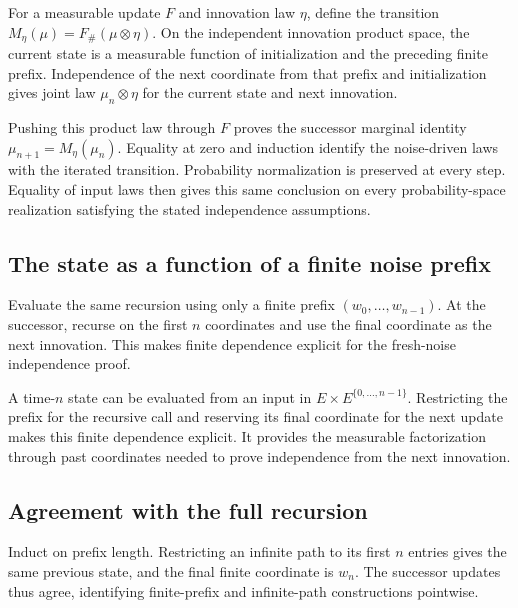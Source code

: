 \documentclass[11pt,a4paper]{report}
\begin{document}
For a measurable update \(F\) and innovation law \(\eta\), define the transition \(M_\eta(\mu)=F_\#(\mu\otimes\eta)\). On the independent innovation product space, the current state is a measurable function of initialization and the preceding finite prefix. Independence of the next coordinate from that prefix and initialization gives joint law \(\mu_n\otimes\eta\) for the current state and next innovation.



Pushing this product law through \(F\) proves the successor marginal identity \(\mu_{n+1}=M_\eta(\mu_n)\). Equality at zero and induction identify the noise-driven laws with the iterated transition. Probability normalization is preserved at every step. Equality of input laws then gives this same conclusion on every probability-space realization satisfying the stated independence assumptions.

\subsection{\texorpdfstring{The state as a function of a finite noise prefix}{The state as a function of a finite noise prefix}}
\label{report-step-UnadjustedLangevin-MarkovLaw-lean-1}


Evaluate the same recursion using only a finite prefix \((w_0,\ldots,w_{n-1})\). At the successor, recurse on the first \(n\) coordinates and use the final coordinate as the next innovation. This makes finite dependence explicit for the fresh-noise independence proof.



A time-\(n\) state can be evaluated from an input in \(E\times E^{\{0,\ldots,n-1\}}\). Restricting the prefix for the recursive call and reserving its final coordinate for the next update makes this finite dependence explicit. It provides the measurable factorization through past coordinates needed to prove independence from the next innovation.

\subsection{\texorpdfstring{Agreement with the full recursion}{Agreement with the full recursion}}
\label{report-step-UnadjustedLangevin-MarkovLaw-lean-2}


Induct on prefix length. Restricting an infinite path to its first \(n\) entries gives the same previous state, and the final finite coordinate is \(w_n\). The successor updates thus agree, identifying finite-prefix and infinite-path constructions pointwise.
\end{document}
